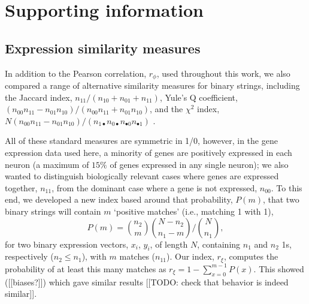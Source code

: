 \documentclass[10pt,letterpaper]{article}
\begin{document}






\newpage
\section*{Supporting information}
\setcounter{figure}{0} \renewcommand{\thefigure}{S\arabic{figure}}
\renewcommand{\thefigure}{S\arabic{figure}}

\subsection*{Expression similarity measures}

In addition to the Pearson correlation, $r_\phi$, used throughout this work, we also compared a range of alternative similarity measures for binary strings, including the
Jaccard index, $n_{11}/(n_{10}+n_{01}+n_{11})$,
Yule's Q coefficient, $(n_{00}n_{11} - n_{01}n_{10})/(n_{00}n_{11} + n_{01}n_{10})$,
and the $\chi^2$ index, $N (n_{00}n_{11} - n_{01}n_{10})/(n_{1\bullet}n_{0\bullet}n_{\bullet 0}n_{\bullet 1})$ \cite{Kaufman2006}.

All of these standard measures are symmetric in 1/0, however, in the gene expression data used here, a minority of genes are positively expressed in each neuron (a maximum of $15\%$ of genes expressed in any single neuron); we also wanted to distinguish biologically relevant cases where genes are expressed together, $n_{11}$, from the dominant case where a gene is not expressed, $n_{00}$.
To this end, we developed a new index based around that probability, $P(m)$, that two binary strings will contain $m$ `positive matches' (i.e., matching 1 with 1),
\begin{equation}
    P(m) = \binom{n_2}{m} \binom{N-n_2}{n_1-m} / \binom{N}{n_1},
\end{equation}
for two binary expression vectors, $x_i$, $y_i$, of length $N$, containing $n_1$ and $n_2$ 1s, respectively ($n_2 \leq n_1$), with $m$ matches ($n_{11}$).
Our index, $r_\xi$, computes the probability of at least this many matches as $r_\xi = 1 - \sum_{x=0}^{m-1} P(x)$.
This showed ([[biases?]]) which gave similar results [[TODO: check that behavior is indeed similar]].
\end{document}

